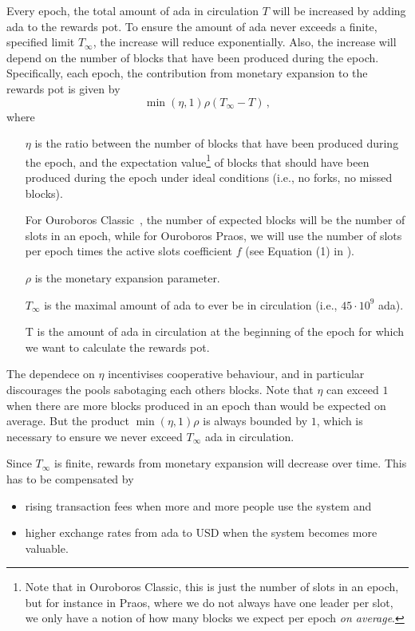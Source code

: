 \documentclass[11pt,a4paper]{article}
\begin{document}
Every epoch, the total amount of ada in circulation \(T\) will be increased by
adding ada to the rewards pot. To ensure the amount of ada never exceeds a
finite, specified limit \(T_\infty\), the increase will reduce exponentially.
Also, the increase will depend on the number of blocks that have been produced
during the epoch. Specifically, each epoch, the contribution from monetary
expansion to the rewards pot is given by
\[\min(\eta, 1) \rho \left(T_\infty - T\right)\,,\]
where
\begin{itemize}
\item[\(\eta\)] is the ratio between the number of blocks that have been produced
  during the epoch, and the expectation value\footnote{Note that in Ouroboros
    Classic, this is just the number of slots in an epoch, but for instance in
    Praos, where we do not always have one leader per slot, we only have a
    notion of how many blocks we expect per epoch \emph{on average}.} of blocks
  that should have been produced during the epoch under ideal conditions (i.e.,
  no forks, no missed blocks).

  For Ouroboros Classic~\citep{ouroboros_classic}, the number of expected blocks
  will be the number of slots in an epoch, while for Ouroboros Praos, we will
  use the number of slots per epoch times the active slots coefficient \(f\)
  (see Equation (1) in \citep{ouroboros_praos}).
\item[\(\rho\)] is the monetary expansion parameter.
\item[\(T_\infty\)] is the maximal amount of ada to ever be in circulation
  (i.e., \(45\cdot10^{9}\) ada).
\item[T] is the amount of ada in circulation at the beginning of the epoch for
  which we want to calculate the rewards pot.
\end{itemize}

The dependece on \(\eta\) incentivises cooperative behaviour, and in particular
discourages the pools sabotaging each others blocks. Note that \(\eta\) can
exceed \(1\) when there are more blocks produced in an epoch than would be
expected on average. But the product \(\min(\eta, 1)\rho\) is always bounded by
\(1\), which is necessary to ensure we never exceed \(T_\infty\) ada in
circulation.

Since \(T_\infty\) is finite, rewards from monetary expansion will
decrease over time. This has to be compensated by

\begin{itemize}
\item
  rising transaction fees when more and more people use the system and
\item
  higher exchange rates from ada to USD when the system becomes more
  valuable.
\end{itemize}
\end{document}
